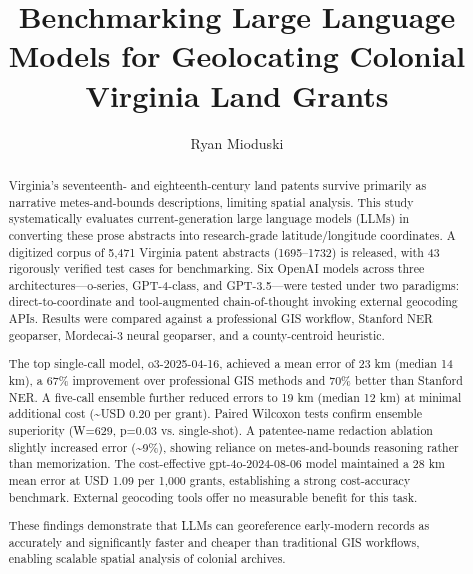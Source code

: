 \documentclass{josis}
\begin{document}
\title{Benchmarking Large Language Models for Geolocating Colonial Virginia Land Grants}
\author{Ryan Mioduski}

\maketitle


\begin{abstract}
Virginia's seventeenth- and eighteenth-century land patents survive primarily as narrative metes-and-bounds descriptions, limiting spatial analysis. This study systematically evaluates current-generation large language models (LLMs) in converting these prose abstracts into research-grade latitude/longitude coordinates. A digitized corpus of 5,471 Virginia patent abstracts (1695–1732) is released, with 43 rigorously verified test cases for benchmarking. Six OpenAI models across three architectures—o-series, GPT-4-class, and GPT-3.5—were tested under two paradigms: direct-to-coordinate and tool-augmented chain-of-thought invoking external geocoding APIs. Results were compared against a professional GIS workflow, Stanford NER geoparser, Mordecai-3 neural geoparser, and a county-centroid heuristic.

The top single-call model, o3-2025-04-16, achieved a mean error of 23 km (median 14 km), a 67\% improvement over professional GIS methods and 70\% better than Stanford NER. A five-call ensemble further reduced errors to 19 km (median 12 km) at minimal additional cost (\textasciitilde USD 0.20 per grant). Paired Wilcoxon tests confirm ensemble superiority (W=629, p=0.03 vs. single-shot). A patentee-name redaction ablation slightly increased error (\textasciitilde 9\%), showing reliance on metes-and-bounds reasoning rather than memorization. The cost-effective gpt-4o-2024-08-06 model maintained a 28 km mean error at USD 1.09 per 1,000 grants, establishing a strong cost-accuracy benchmark. External geocoding tools offer no measurable benefit for this task.

These findings demonstrate that LLMs can georeference early-modern records as accurately and significantly faster and cheaper than traditional GIS workflows, enabling scalable spatial analysis of colonial archives.
\end{abstract}





\end{document}
